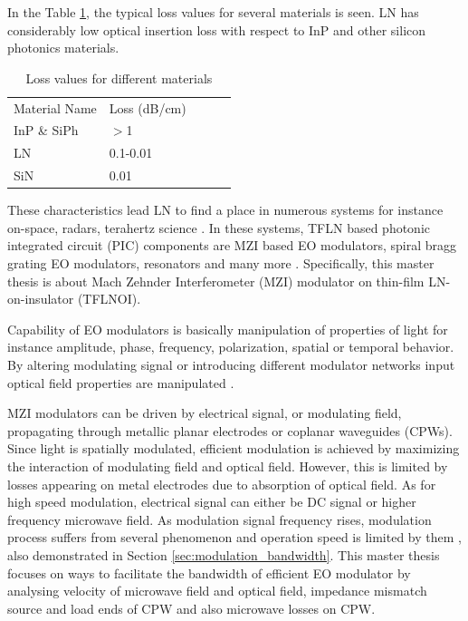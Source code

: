 \documentclass[thesis]{deutez}
\begin{document}
    In the Table \ref{tab:losses_compared}, the typical loss values for several materials is seen. LN has considerably low optical insertion loss with respect to InP and other silicon photonics materials. 
    
    \begin{table}[h]
        \centering
        \begin{tabular}{|l|l|l|ll}
            \cline{1-2}
            Material Name & Loss (dB/cm) \\ \cline{1-2}
            InP \& SiPh & $>$1       \\ \cline{1-2}
            LN & 0.1-0.01     \\ \cline{1-2}
            SiN         & 0.01      \\ \cline{1-2}
        \end{tabular}
        \caption{Loss values for different materials\cite{9}}
        \label{tab:losses_compared}
    \end{table}
	
	These characteristics lead LN to find a place in numerous systems for instance on-space\cite{9}, radars\cite{23}, terahertz science \cite{22}. In these systems, TFLN based photonic integrated circuit (PIC) components are MZI based EO modulators, spiral bragg grating EO modulators, resonators and many more \cite{1}. Specifically, this master thesis is about Mach Zehnder Interferometer (MZI) modulator on thin-film LN-on-insulator (TFLNOI). 
	
	Capability of EO modulators is basically manipulation of properties of light for instance amplitude, phase, frequency, polarization, spatial or temporal behavior. By altering modulating signal or introducing different modulator networks input optical field properties are manipulated \cite{29}.
	
	MZI modulators can be driven by electrical signal, or modulating field, propagating through metallic planar electrodes or coplanar waveguides (CPWs). Since light is spatially modulated, efficient modulation is achieved by maximizing the interaction of modulating field and optical field. However, this is limited by losses appearing on metal electrodes \cite{14} due to absorption of optical field. As for high speed modulation, electrical signal can either be DC signal or higher frequency microwave field. As modulation signal frequency rises, modulation process suffers from several phenomenon and operation speed is limited by them \cite{14}, also demonstrated in Section \ref{sec:modulation_bandwidth}. This master thesis focuses on ways to facilitate the bandwidth of efficient EO modulator by analysing velocity of microwave field and optical field, impedance mismatch source and load ends of CPW and also microwave losses on CPW.
	
\end{document}
